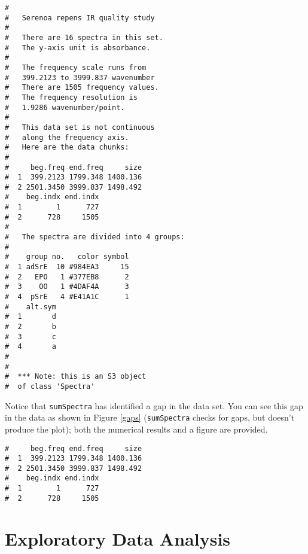 \documentclass[letter,10pt,twocolumn,twoside,printwatermark=false]{pinp}
\begin{document}
\begin{ShadedResult}
\begin{verbatim}
#  
#   Serenoa repens IR quality study 
#  
#   There are 16 spectra in this set.
#   The y-axis unit is absorbance.
#  
#   The frequency scale runs from
#   399.2123 to 3999.837 wavenumber
#   There are 1505 frequency values.
#   The frequency resolution is
#   1.9286 wavenumber/point.
#  
#   This data set is not continuous
#   along the frequency axis.
#   Here are the data chunks:
#  
#     beg.freq end.freq     size
#  1  399.2123 1799.348 1400.136
#  2 2501.3450 3999.837 1498.492
#    beg.indx end.indx
#  1        1      727
#  2      728     1505
#  
#   The spectra are divided into 4 groups: 
#  
#    group no.   color symbol
#  1 adSrE  10 #984EA3     15
#  2   EPO   1 #377EB8      2
#  3    OO   1 #4DAF4A      3
#  4  pSrE   4 #E41A1C      1
#    alt.sym
#  1       d
#  2       b
#  3       c
#  4       a
#  
#  
#  *** Note: this is an S3 object
#  of class 'Spectra'
\end{verbatim}
\end{ShadedResult}

Notice that \texttt{sumSpectra} has identified a gap in the data set.
You can see this gap in the data as shown in Figure \ref{gaps}
(\texttt{sumSpectra} checks for gaps, but doesn't produce the plot);
both the numerical results and a figure are provided.

\begin{Shaded}
\begin{Highlighting}[]
\OperatorTok{$}\OperatorTok{$}\NormalTok{data[}\NormalTok{,],}
   \NormalTok{)}
\end{Highlighting}
\end{Shaded}

\begin{ShadedResult}
\begin{verbatim}
#     beg.freq end.freq     size
#  1  399.2123 1799.348 1400.136
#  2 2501.3450 3999.837 1498.492
#    beg.indx end.indx
#  1        1      727
#  2      728     1505
\end{verbatim}
\end{ShadedResult}

\hypertarget{exploratory-data-analysis}{%
\section{Exploratory Data Analysis}\label{exploratory-data-analysis}}
\end{document}
